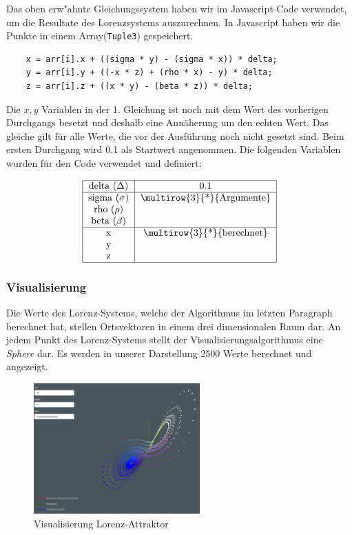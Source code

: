 Das oben erw"ahnte Gleichungssystem haben wir im Javascript-Code verwendet, um die Resultate des Lorenzsystems auszurechnen. In Javascript haben wir die Punkte in einem Array(\texttt{Tuple3}) gespeichert.

	\begin{lstlisting}
	x = arr[i].x + ((sigma * y) - (sigma * x)) * delta;
	y = arr[i].y + ((-x * z) + (rho * x) - y) * delta;
	z = arr[i].z + ((x * y) - (beta * z)) * delta;
	\end{lstlisting}

Die $ x, y $ Variablen in der 1. Gleichung ist noch mit dem Wert des vorherigen Durchgangs besetzt und deshalb eine Annäherung um den echten Wert. Das gleiche gilt für alle Werte, die vor der Ausführung noch nicht gesetzt sind. Beim ersten Durchgang wird 0.1 als Startwert angenommen. Die folgenden Variablen wurden für den Code verwendet und definiert:

\begin{align}
	\begin{tabular}{| c | c |}
		\hline
		delta $ (\Delta) $ & 0.1 \\\hline
		sigma $ (\sigma) $ & \multirow{3}{*}{Argumente}\\
		rho $(\rho) $ & \\
		beta $ (\beta) $ & \\\hline
		x & \multirow{3}{*}{berechnet}\\
		y & \\
		z & \\\hline
	\end{tabular}
\end{align}

\subsubsection{Visualisierung}
Die Werte des Lorenz-Systems, welche der Algorithmus im letzten Paragraph berechnet hat, stellen Ortsvektoren in einem drei dimensionalen Raum dar. An jedem Punkt des Lorenz-Systems stellt der Visualisierungsalgorithmus eine \textit{Sphere} dar. Es werden in unserer Darstellung 2500 Werte berechnet und angezeigt.

\begin{figure}
	\centering	\includegraphics[height=5cm]{lorenz/assets/implementation/Visualisierung}
	\caption{Visualisierung Lorenz-Attraktor}
	\label{fig:visualisierung}
\end{figure}
